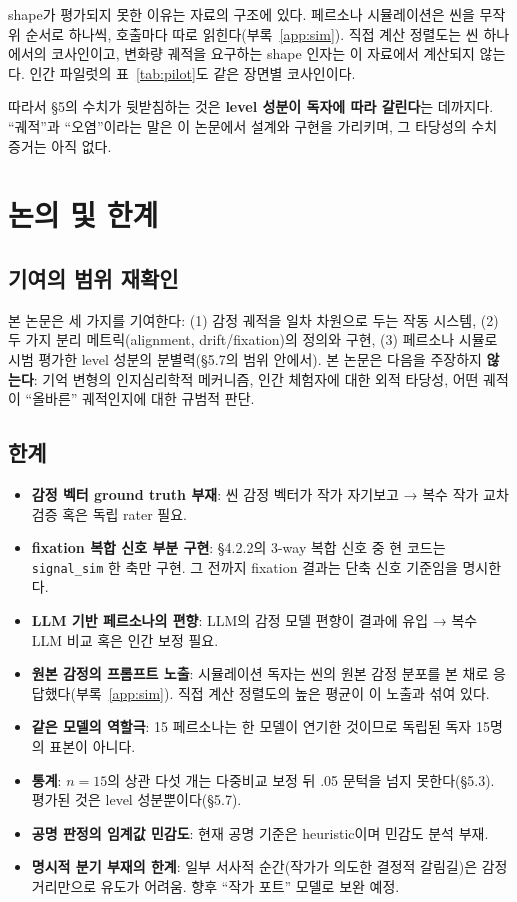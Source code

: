 \documentclass[11pt, a4paper]{article}
\begin{document}
shape가 평가되지 못한 이유는 자료의 구조에 있다. 페르소나 시뮬레이션은 씬을 무작위 순서로 하나씩, 호출마다 따로 읽힌다(부록~\ref{app:sim}). 직접 계산 정렬도는 씬 하나에서의 코사인이고, 변화량 궤적을 요구하는 shape 인자는 이 자료에서 계산되지 않는다. 인간 파일럿의 표~\ref{tab:pilot}도 같은 장면별 코사인이다.

따라서 \S5의 수치가 뒷받침하는 것은 \textbf{level 성분이 독자에 따라 갈린다}는 데까지다. ``궤적''과 ``오염''이라는 말은 이 논문에서 설계와 구현을 가리키며, 그 타당성의 수치 증거는 아직 없다.

\section{논의 및 한계}

\subsection{기여의 범위 재확인}
본 논문은 세 가지를 기여한다: (1) 감정 궤적을 일차 차원으로 두는 작동 시스템, (2) 두 가지 분리 메트릭(alignment, drift/fixation)의 정의와 구현, (3) 페르소나 시뮬로 시범 평가한 level 성분의 분별력(\S5.7의 범위 안에서). 본 논문은 다음을 주장하지 \textbf{않는다}: 기억 변형의 인지심리학적 메커니즘, 인간 체험자에 대한 외적 타당성, 어떤 궤적이 ``올바른'' 궤적인지에 대한 규범적 판단.

\subsection{한계}
\begin{itemize}
  \item \textbf{감정 벡터 ground truth 부재}: 씬 감정 벡터가 작가 자기보고 → 복수 작가 교차 검증 혹은 독립 rater 필요.
  \item \textbf{fixation 복합 신호 부분 구현}: \S4.2.2의 3-way 복합 신호 중 현 코드는 \texttt{signal\_sim} 한 축만 구현. 그 전까지 fixation 결과는 단축 신호 기준임을 명시한다.
  \item \textbf{LLM 기반 페르소나의 편향}: LLM의 감정 모델 편향이 결과에 유입 → 복수 LLM 비교 혹은 인간 보정 필요.
  \item \textbf{원본 감정의 프롬프트 노출}: 시뮬레이션 독자는 씬의 원본 감정 분포를 본 채로 응답했다(부록~\ref{app:sim}). 직접 계산 정렬도의 높은 평균이 이 노출과 섞여 있다.
  \item \textbf{같은 모델의 역할극}: 15 페르소나는 한 모델이 연기한 것이므로 독립된 독자 15명의 표본이 아니다.
  \item \textbf{통계}: $n=15$의 상관 다섯 개는 다중비교 보정 뒤 .05 문턱을 넘지 못한다(\S5.3). 평가된 것은 level 성분뿐이다(\S5.7).
  \item \textbf{공명 판정의 임계값 민감도}: 현재 공명 기준은 heuristic이며 민감도 분석 부재.
  \item \textbf{명시적 분기 부재의 한계}: 일부 서사적 순간(작가가 의도한 결정적 갈림길)은 감정 거리만으로 유도가 어려움. 향후 ``작가 포트'' 모델로 보완 예정.
\end{itemize}
\end{document}
